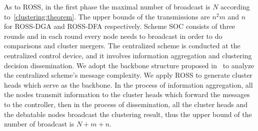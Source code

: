 \documentclass[10pt,journal,compsoc]{IEEEtran}
\theoremstyle{mytheoremstyle}
\theoremstyle{mytheoremstyle}
\theoremstyle{mytheoremstyle}
\begin{document}
As to ROSS, in the first phase the maximal number of broadcast is $N$ according to~\ref{clustering:theorem}.
The upper bounds of the transmissions are $n^2m$ and $n$ for ROSS-DGA and ROSS-DFA respectively.
Scheme SOC consists of three rounds and in each round every node needs to broadcast in order to do comparisons and cluster mergers.
The centralized scheme is conducted at the centralized control device, and it involves information aggregation and clustering decision dissemination.
We adopt the backbone structure proposed in~\cite{Efficient_broadcasting_gathering_adhoc} to analyze the centralized scheme's message complexity.
We apply ROSS to generate cluster heads which serve as the backbone.
In the process of information aggregation, all the nodes transmit information to the cluster heads which forward the messages to the controller, then in the process of dissemination, all the cluster heads and the debatable nodes broadcast the clustering result, thus the upper bound of the number of broadcast is $N+m+n$.
\end{document}
